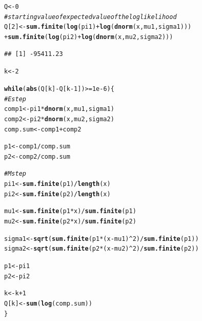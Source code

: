 \documentclass{article}\usepackage[]{graphicx}\usepackage[]{xcolor}
\makeatletter
\newcommand{\hlnum}[1]{\textcolor[rgb]{0.686,0.059,0.569}{#1}}%
\newcommand{\hlcom}[1]{\textcolor[rgb]{0.678,0.584,0.686}{\textit{#1}}}%
\newcommand{\hlopt}[1]{\textcolor[rgb]{0,0,0}{#1}}%
\newcommand{\hlstd}[1]{\textcolor[rgb]{0.345,0.345,0.345}{#1}}%
\newcommand{\hlkwa}[1]{\textcolor[rgb]{0.161,0.373,0.58}{\textbf{#1}}}%
\newcommand{\hlkwb}[1]{\textcolor[rgb]{0.69,0.353,0.396}{#1}}%
\newcommand{\hlkwd}[1]{\textcolor[rgb]{0.737,0.353,0.396}{\textbf{#1}}}%
\newenvironment{kframe}{%
 \def\at@end@of@kframe{}%
 \ifinner\ifhmode%
  \def\at@end@of@kframe{\end{minipage}}%
  \begin{minipage}{\columnwidth}%
 \fi\fi%
 \def\FrameCommand##1{\hskip\@totalleftmargin \hskip-\fboxsep
 \colorbox{shadecolor}{##1}\hskip-\fboxsep
     \hskip-\linewidth \hskip-\@totalleftmargin \hskip\columnwidth}%
 \MakeFramed {\advance\hsize-\width
   \@totalleftmargin\z@ \linewidth\hsize
   \@setminipage}}%
 {\par\unskip\endMakeFramed%
 \at@end@of@kframe}
\newenvironment{knitrout}{}{} %
\theoremstyle{plain}
\theoremstyle{definition}
\theoremstyle{remark}
\makeatother
\begin{document}
\begin{knitrout}
\color{fgcolor}\begin{kframe}
\begin{alltt}
\hlstd{Q} \hlkwb{<-} \hlnum{0}
\hlcom{# starting value of expected value of the log likelihood}
\hlstd{Q[}\hlnum{2}\hlstd{]} \hlkwb{<-} \hlkwd{sum.finite}\hlstd{(}\hlkwd{log}\hlstd{(pi1)}\hlopt{+}\hlkwd{log}\hlstd{(}\hlkwd{dnorm}\hlstd{(x, mu1, sigma1)))}
  \hlopt{+} \hlkwd{sum.finite}\hlstd{(}\hlkwd{log}\hlstd{(pi2)}\hlopt{+}\hlkwd{log}\hlstd{(}\hlkwd{dnorm}\hlstd{(x, mu2, sigma2)))}
\end{alltt}
\begin{verbatim}
## [1] -95411.23
\end{verbatim}
\begin{alltt}
\hlstd{k} \hlkwb{<-} \hlnum{2}

\hlkwa{while} \hlstd{(}\hlkwd{abs}\hlstd{(Q[k]}\hlopt{-}\hlstd{Q[k}\hlopt{-}\hlnum{1}\hlstd{])}\hlopt{>=}\hlnum{1e-6}\hlstd{) \{}
  \hlcom{# E step}
  \hlstd{comp1} \hlkwb{<-} \hlstd{pi1} \hlopt{*} \hlkwd{dnorm}\hlstd{(x, mu1, sigma1)}
  \hlstd{comp2} \hlkwb{<-} \hlstd{pi2} \hlopt{*} \hlkwd{dnorm}\hlstd{(x, mu2, sigma2)}
  \hlstd{comp.sum} \hlkwb{<-} \hlstd{comp1} \hlopt{+} \hlstd{comp2}

  \hlstd{p1} \hlkwb{<-} \hlstd{comp1}\hlopt{/}\hlstd{comp.sum}
  \hlstd{p2} \hlkwb{<-} \hlstd{comp2}\hlopt{/}\hlstd{comp.sum}

  \hlcom{# M step}
  \hlstd{pi1} \hlkwb{<-} \hlkwd{sum.finite}\hlstd{(p1)} \hlopt{/} \hlkwd{length}\hlstd{(x)}
  \hlstd{pi2} \hlkwb{<-} \hlkwd{sum.finite}\hlstd{(p2)} \hlopt{/} \hlkwd{length}\hlstd{(x)}

  \hlstd{mu1} \hlkwb{<-} \hlkwd{sum.finite}\hlstd{(p1} \hlopt{*} \hlstd{x)} \hlopt{/} \hlkwd{sum.finite}\hlstd{(p1)}
  \hlstd{mu2} \hlkwb{<-} \hlkwd{sum.finite}\hlstd{(p2} \hlopt{*} \hlstd{x)} \hlopt{/} \hlkwd{sum.finite}\hlstd{(p2)}

  \hlstd{sigma1} \hlkwb{<-} \hlkwd{sqrt}\hlstd{(}\hlkwd{sum.finite}\hlstd{(p1} \hlopt{*} \hlstd{(x}\hlopt{-}\hlstd{mu1)}\hlopt{^}\hlnum{2}\hlstd{)} \hlopt{/} \hlkwd{sum.finite}\hlstd{(p1))}
  \hlstd{sigma2} \hlkwb{<-} \hlkwd{sqrt}\hlstd{(}\hlkwd{sum.finite}\hlstd{(p2} \hlopt{*} \hlstd{(x}\hlopt{-}\hlstd{mu2)}\hlopt{^}\hlnum{2}\hlstd{)} \hlopt{/} \hlkwd{sum.finite}\hlstd{(p2))}

  \hlstd{p1} \hlkwb{<-} \hlstd{pi1}
  \hlstd{p2} \hlkwb{<-} \hlstd{pi2}

  \hlstd{k} \hlkwb{<-} \hlstd{k} \hlopt{+} \hlnum{1}
  \hlstd{Q[k]} \hlkwb{<-} \hlkwd{sum}\hlstd{(}\hlkwd{log}\hlstd{(comp.sum))}
\hlstd{\}}
\end{alltt}
\end{kframe}
\end{knitrout}
\newpage
\end{document}

